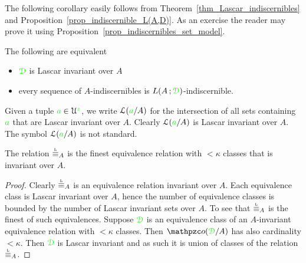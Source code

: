 The following corollary easily follows from Theorem~\ref{thm_Lascar_indiscernibles} and Proposition~\ref{prop_indiscernible_L(A,D)}.
As an exercise the reader may prove it using Proposition~\ref{prop_indiscernibles_set_model}.
 
\begin{corollary}
The following are equivalent
\begin{itemize}
\item[1.] ${\color{green}\EuScript D}$ is Lascar invariant over $A$
\item[2.] every sequence of $A$-indiscernibles is $L(A\,;{\color{green}\EuScript D})$-indiscernible.
\end{itemize}
\end{corollary}

\noindent\llap{\textcolor{red}{\Large\warning}\kern1.5ex}%
Given a tuple ${\color{green} a}\in\EuScript U^{\color{green} z}$, we write \emph{$\EuScript L({\color{green} a}/A)$\/} for the intersection of all sets containing ${\color{green} a}$ that are Lascar invariant over $A$.
Clearly $\EuScript L({\color{green} a}/A)$ is Lascar invariant over $A$.
The symbol $\EuScript L({\color{green} a}/A)$ is not standard.


\begin{proposition}
  The relation $\equivL_A$ is the finest equivalence relation with $<\kappa$ classes that is invariant over $A$.
\end{proposition}

\begin{proof}
  Clearly $\equivL_A$ is an equivalence relation invariant over $A$.
Each equivalence class is Lascar invariant over $A$, hence the number of equivalence classes is bounded by the number of Lascar invariant sets over $A$.
To see that $\equivL_A$ is the finest of such equivalences.
Suppose ${\color{green}\EuScript D}$ is an equivalence class of an $A$-invariant equivalence relation with $<\kappa$ classes.
Then $\oorbit(\grD/A)$ has also cardinality $<\kappa$.
Then ${\color{green}\EuScript D}$ is Lascar invariant and as such it is union of classes of the relation $\equivL_A$. 
\end{proof}

